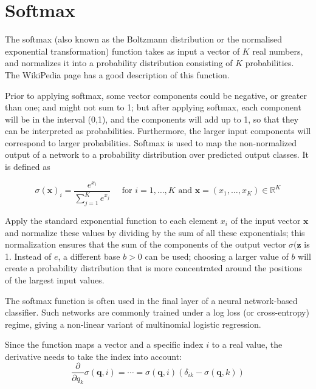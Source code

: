\section{Softmax}
\label{sec:c10-softmax}
The softmax (also known as the Boltzmann distribution or the normalised exponential transformation) function takes as input a vector of $K$ real numbers, and normalizes it into a probability distribution consisting of $K$ probabilities. 
The WikiPedia page  \cite{WikiPediaSoftmaxFunction2019} has a good description of this function.

Prior to applying softmax, some vector components could be negative, or greater than one; and might not sum to 1; but after applying softmax, each component will be in the interval (0,1), and the components will add up to 1, so that they can be interpreted as probabilities. Furthermore, the larger input components will correspond to larger probabilities. Softmax is used to map the non-normalized output of a network to a probability distribution over predicted output classes. 
It is defined as \cite{WikiPediaSoftmaxFunction2019,HamzaMahmood2018}

\begin{equation}
\sigma(\mathbf{x})_{i}=\frac{e^{x_{i}}}{\sum_{j=1}^{K} e^{x_{j}}} \quad \text { for } i=1, \ldots, K \text { and } \mathbf{x}=\left(x_{1}, \ldots, x_{K}\right) \in \mathbb{R}^{K}
\end{equation}

Apply the standard exponential function to each element $x_i$  of the input vector $\mathbf{x}$ and normalize these values by dividing by the sum of all these exponentials; this normalization ensures that the sum of the components of the output vector $\sigma(\mathbf {z}$ is 1. 
Instead of $e$, a different base $b>0$ can be used; choosing a larger value of $b$ will create a probability distribution that is more concentrated around the positions of the largest input values. 

The softmax function is often used in the final layer of a neural network-based classifier. Such networks are commonly trained under a log loss (or cross-entropy) regime, giving a non-linear variant of multinomial logistic regression.

Since the function maps a vector and a specific index $i$ to a real value, the derivative needs to take the index into account: 
\begin{equation}
\frac{\partial}{\partial q_{k}} \sigma(\mathbf{q}, i)=\cdots=\sigma(\mathbf{q}, i)\left(\delta_{i k}-\sigma(\mathbf{q}, k)\right)
\end{equation}

